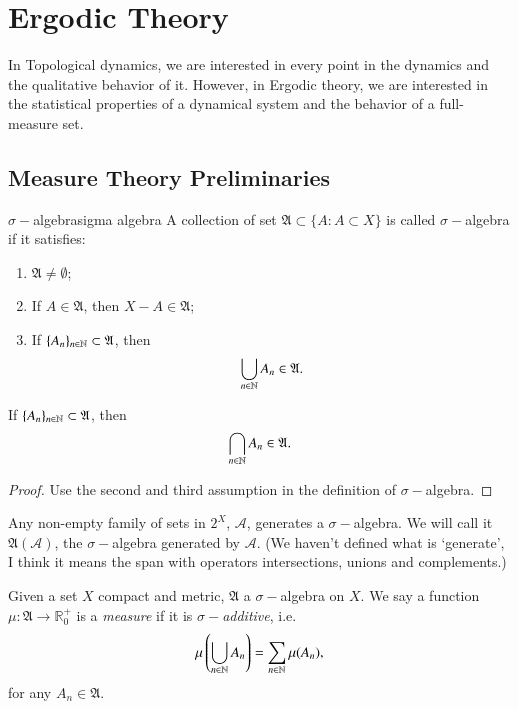 \documentclass[12pt,a4paper]{article}
\begin{document}
		
		
	
	
	
	
	
	
	
	
	
	
	
	
	

	\section{Ergodic Theory}
	In Topological dynamics, we are interested in every point in the dynamics and the qualitative behavior of it. However, in Ergodic theory, we are interested in the statistical properties of a dynamical system and the behavior of a full-measure set.
	
	\subsection{Measure Theory Preliminaries}
	\newcommand{\frakA}{\mathfrak{A}}
	\begin{definition}{$\sigma-$algebra}{sigma algebra}
		A collection of set $\frakA\subset \{A:A\subset X\}$ is called $\sigma-$algebra if it satisfies:
		\begin{enumerate}
			\item $\frakA\neq \emptyset$;
			\item If $A\in \frakA$, then $X-A\in \frakA$;
			\item If $\{A_n\}_{n\in\N}\subset \frakA$, then 
			$$
			\bigcup_{n\in \N} A_n \in \frakA.
			$$
		\end{enumerate}
	\end{definition}
	
	\begin{proposition}{}{}
		If $\{A_n\}_{n\in\N}\subset \frakA$, then 
		$$
		\bigcap_{n\in \N} A_n \in \frakA.
		$$
		
 	\end{proposition}
	\begin{proof}
		Use the second and third assumption in the definition of $\sigma-$algebra.
	\end{proof}
			\newcommand{\A}{\mathcal{A}}
	Any non-empty family of sets in $2^X$, $\A$, generates a $\sigma-$algebra. We will call it $\frakA(\A)$, the $\sigma-$algebra generated by $\A$. (We haven't defined what is 	`generate', I think it means the span with operators intersections, unions and complements.)
	\begin{definition}{}{}
		Given a set $X$ compact and metric, $\frakA$ a $\sigma-$algebra on $X$. We say a function $\mu: \frakA\rightarrow \mathbb{R}_0^+$ is a \emph{measure} if it is \emph{$\sigma-$additive}, i.e.
		$$
		\mu\left(\bigcup_{n\in \mathbb{N}} A_n\right) = \sum_{n\in\mathbb{N}} \mu(A_n),
		$$
		for any $A_n\in \frakA$.
	\end{definition}
	
\end{document}
